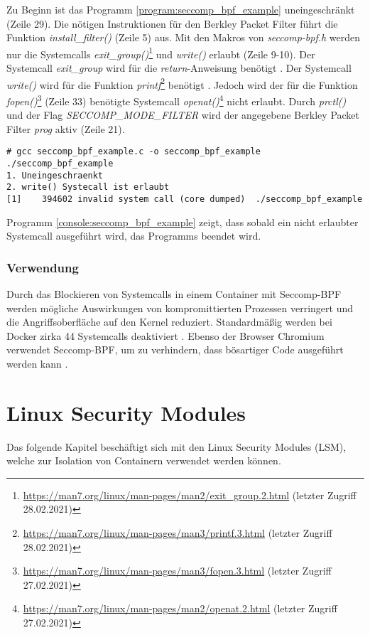 Zu Beginn ist das Programm \ref{program:seccomp_bpf_example} uneingeschränkt (Zeile 29). Die nötigen
Instruktionen für den Berkley Packet Filter führt die Funktion
\mbox{\emph{install\_filter()}} (Zeile 5) aus. Mit den Makros von
\emph{seccomp-bpf.h} werden nur die Systemcalls
\emph{exit\_group()}\footnote{\url{https://man7.org/linux/man-pages/man2/exit_group.2.html}
(letzter Zugriff 28.02.2021)} und \emph{write()} erlaubt (Zeile 9-10). Der
Systemcall \emph{exit\_group} wird für die \emph{return}-Anweisung benötigt
\cite[S.532]{TheLinuxProgrammingInterface}. Der Systemcall \emph{write()} wird
für die Funktion
\emph{printf}\footnote{\url{https://man7.org/linux/man-pages/man3/printf.3.html}
(letzter Zugriff 28.02.2021)} benötigt
\cite[S.30]{TheLinuxProgrammingInterface}. Jedoch wird der für die Funktion
\mbox{\emph{fopen()}}\footnote{\url{https://man7.org/linux/man-pages/man3/fopen.3.html}
(letzter Zugriff 27.02.2021)} (Zeile 33) benötigte Systemcall
\emph{openat()}\footnote{\url{https://man7.org/linux/man-pages/man2/openat.2.html}
(letzter Zugriff 27.02.2021)} nicht erlaubt. Durch \emph{prctl()} und der Flag
\emph{SECCOMP\_MODE\_FILTER} wird der angegebene Berkley Packet Filter
\emph{prog} aktiv (Zeile 21).


\clearpage
\begin{lstlisting}[label={console:seccomp_bpf_example},caption={Kompilieren und
Ausführen des Programms \ref{program:seccomp_bpf_example}}]
# gcc seccomp_bpf_example.c -o seccomp_bpf_example
./seccomp_bpf_example
1. Uneingeschraenkt
2. write() Systecall ist erlaubt
[1]    394602 invalid system call (core dumped)  ./seccomp_bpf_example
\end{lstlisting}

Programm \ref{console:seccomp_bpf_example} zeigt, dass sobald ein nicht
erlaubter Systemcall ausgeführt wird, das Programms beendet wird.

\subsection{Verwendung}
Durch das Blockieren von Systemcalls in einem Container mit Seccomp-BPF 
werden mögliche Auswirkungen von kompromittierten Prozessen verringert und 
die Angriffsoberfläche auf den Kernel reduziert. Standardmä{\ss}ig werden bei
Docker zirka 44 Systemcalls deaktiviert \cite{docker_seccomp}. Ebenso der
Browser Chromium verwendet Seccomp-BPF, um zu verhindern, dass bösartiger Code
ausgeführt werden kann \cite{chrome_linux_sandboxing}.

\chapter{Linux Security Modules}
Das folgende Kapitel beschäftigt sich mit den Linux Security Modules (LSM),
welche zur Isolation von Containern verwendet werden können.
